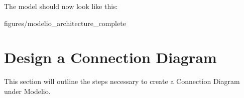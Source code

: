 \documentclass[11pt,a4paper]{../tutorial}
\begin{document}
\begin{instructions}
The model should now look like this:

\begin{center}
\begin{annotation}[width=0.7\linewidth]{figures/modelio_architecture_complete}
    \end{annotation}
\end{center}


\end{instructions}


\newpage

\section{Design a Connection Diagram}

This section will outline the steps necessary to create a Connection Diagram under Modelio.
\end{document}
